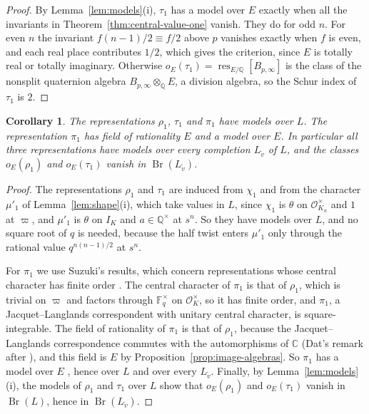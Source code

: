 \documentclass[a4paper,11pt]{amsart}
\newtheorem{corollary}[theorem]{Corollary}
\theoremstyle{definition}
\theoremstyle{remark}
\numberwithin{equation}{section}
\newcommand{\Q}{\mathbb{Q}}
\DeclareMathOperator{\Br}{Br}
\DeclareMathOperator{\res}{res}
\newcommand{\F}{\mathbb{F}}
\newcommand{\C}{\mathbb{C}}
\newcommand{\OO}{\mathcal{O}}
\begin{document}
\begin{proof}
By Lemma~\ref{lem:models}(i), $\tau_1$ has a model over $E$ exactly when all the invariants in Theorem~\ref{thm:central-value-one} vanish. They do for odd $n$. For even $n$ the invariant $f(n-1)/2\equiv f/2$ above $p$ vanishes exactly when $f$ is even, and each real place contributes $1/2$, which gives the criterion, since $E$ is totally real or totally imaginary. Otherwise $o_E(\tau_1)=\res_{E/\Q}[B_{p,\infty}]$ is the class of the nonsplit quaternion algebra $B_{p,\infty}\otimes_\Q E$, a division algebra, so the Schur index of $\tau_1$ is $2$.
\end{proof}

\begin{corollary}\label{cor:fields-of-definition}
The representations $\rho_1$, $\tau_1$ and $\pi_1$ have models over $L$. The representation $\pi_1$ has field of rationality $E$ and a model over $E$. In particular all three representations have models over every completion $L_{\tilde v}$ of $L$, and the classes $o_E(\rho_1)$ and $o_E(\tau_1)$ vanish in $\Br(L_{\tilde v})$.
\end{corollary}

\begin{proof}
The representations $\rho_1$ and $\tau_1$ are induced from $\chi_1$ and from the character $\mu'_1$ of Lemma~\ref{lem:shape}(i), which take values in $L$, since $\chi_1$ is $\theta$ on $\OO_{K_n}^\times$ and $1$ at $\varpi$, and $\mu'_1$ is $\theta$ on $I_K$ and $a\in\Q^\times$ at $s^n$. So they have models over $L$, and no square root of $q$ is needed, because the half twist enters $\mu'_1$ only through the rational value $q^{n(n-1)/2}$ at $s^n$.

For $\pi_1$ we use Suzuki's results, which concern representations whose central character has finite order \cite[Hypothesis~4.0.1]{Su23}. The central character of $\pi_1$ is that of $\rho_1$, which is trivial on $\varpi$ and factors through $\F_q^\times$ on $\OO_K^\times$, so it has finite order, and $\pi_1$, a Jacquet--Langlands correspondent with unitary central character, is square-integrable. The field of rationality of $\pi_1$ is that of $\rho_1$, because the Jacquet--Langlands correspondence commutes with the automorphisms of $\C$ (Dat's remark after \cite[Th\'eor\`eme~2.1.2]{Dat07}), and this field is $E$ by Proposition~\ref{prop:image-algebras}. So $\pi_1$ has a model over $E$ \cite[Lemma~4.0.4]{Su23}, hence over $L$ and over every $L_{\tilde v}$. Finally, by Lemma~\ref{lem:models}(i), the models of $\rho_1$ and $\tau_1$ over $L$ show that $o_E(\rho_1)$ and $o_E(\tau_1)$ vanish in $\Br(L)$, hence in $\Br(L_{\tilde v})$.
\end{proof}
\end{document}
